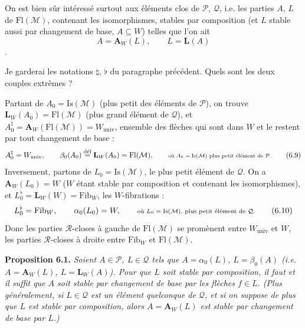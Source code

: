 \documentclass[11pt]{article}
\newcommand{\printedpage}[1]{\marginpar{\footnotesize p.~#1}}
\newcommand{\msp}[1]{\marginpar{\footnotesize [#1]}}
\newcommand{\Fl}{\mathrm{Fl}}
\newcommand{\Is}{\mathrm{Is}}
\newcommand{\Fib}{\mathrm{Fib}}
\begin{document}
\printedpage{54}
On est bien sûr intéressé surtout aux éléments clos de $\mathcal{P}$, $\mathcal{Q}$, i.e. les parties $A$, $L$ de $\Fl(\mathcal{M})$, contenant les isomorphismes, stables par composition (et $L$ stable aussi par changement de base, $A \subseteq W$) telles que l'on ait
\[
A = \mathbf{A}_W(L), \qquad L = \mathbf{L}(A) \tag*{(6.8)}
\]
.

\msp{page 87}

Je garderai les notations $\natural$, $\flat$ du paragraphe précédent. Quels sont les deux couples extrêmes ?

Partant de $A_0 = \Is(\mathcal{M})$ (plus petit des éléments de $\mathcal{P}$), on trouve $\mathbf{L}_W(A_0) = \Fl(\mathcal{M})$ (plus grand élément de $\mathcal{Q}$), et $A_0^{\natural} = \mathbf{A}_W(\Fl(\mathcal{M})) = W_{\mathrm{univ}}$, ensemble des flèches qui sont dans $W$ et le restent par tout changement de base :
\[
A_0^{\natural} = W_{\mathrm{univ}}, \qquad \beta_0(A_0) \overset{\text{déf}}{=} \mathbf{L}_W(A_0) = \Fl(\mathcal{M}), \qquad \text{\scriptsize où $A_0 = \Is(\mathcal{M})$ plus petit élément de $\mathcal{P}$.} \tag*{(6.9)}
\]
Inversement, partons de $L_0 = \Is(\mathcal{M})$, le plus petit élément de $\mathcal{Q}$. On a $\mathbf{A}_W(L_0) = W$ ($W$ étant stable par composition et contenant les isomorphismes), et $L_0^{\flat} = \mathbf{L}_W(W) = \Fib_W$, les $W$-fibrations :
\[
L_0^{\flat} = \Fib_W, \qquad \alpha_0(L_0) = W, \qquad \text{\scriptsize où $L_0 = \Is(\mathcal{M})$, plus petit élément de $\mathcal{Q}$.} \tag*{(6.10)}
\]
Donc les parties $\mathcal{R}$-closes à gauche de $\Fl(\mathcal{M})$ se promènent entre $W_{\mathrm{univ}}$ et $W$, les parties $\mathcal{R}$-closes à droite entre $\Fib_W$ et $\Fl(\mathcal{M})$.

\textbf{Proposition 6.1.} \textit{Soient $A \in \mathcal{P}$, $L \in \mathcal{Q}$ tels que $A = \alpha_0(L)$, $L = \beta_0(A)$ (i.e. $A = \mathbf{A}_W(L)$, $L = \mathbf{L}_W(A)$). Pour que $L$ soit stable par composition, il faut et il suffit que $A$ soit stable par changement de base par les flèches $f \in L$. (Plus généralement, si $L \in \mathcal{Q}$ est un élément quelconque de $\mathcal{Q}$, et si on suppose de} \msp{page 88} \textit{plus que $L$ est stable par composition, alors $A = \mathbf{A}_W(L)$ est stable par changement de base par $L$.)}
\end{document}
